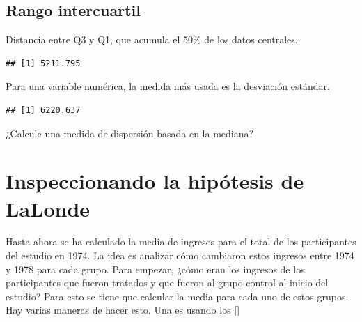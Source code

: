 \documentclass[
]{article}
\newenvironment{Shaded}{\begin{snugshade}}{\end{snugshade}}
\newcommand{\DecValTok}[1]{\textcolor[rgb]{0.00,0.00,0.81}{#1}}
\newcommand{\FunctionTok}[1]{\textcolor[rgb]{0.00,0.00,0.00}{#1}}
\newcommand{\NormalTok}[1]{#1}
\newcommand{\SpecialCharTok}[1]{\textcolor[rgb]{0.00,0.00,0.00}{#1}}
\begin{document}
\hypertarget{rango-intercuartil-1}{%
\subsection{Rango intercuartil}\label{rango-intercuartil-1}}

Distancia entre Q3 y Q1, que acumula el 50\% de los datos centrales.

\begin{Shaded}
\end{Shaded}

\begin{verbatim}
## [1] 5211.795
\end{verbatim}

Para una variable numérica, la medida más usada es la desviación
estándar.

\begin{Shaded}
\end{Shaded}

\begin{verbatim}
## [1] 6220.637
\end{verbatim}

¿Calcule una medida de dispersión basada en la mediana?

\hypertarget{inspeccionando-la-hipuxf3tesis-de-lalonde}{%
\section{Inspeccionando la hipótesis de
LaLonde}\label{inspeccionando-la-hipuxf3tesis-de-lalonde}}

Hasta ahora se ha calculado la media de ingresos para el total de los
participantes del estudio en 1974. La idea es analizar cómo cambiaron
estos ingresos entre 1974 y 1978 para cada grupo. Para empezar, ¿cómo
eran los ingresos de los participantes que fueron tratados y que fueron
al grupo control al inicio del estudio? Para esto se tiene que calcular
la media para cada uno de estos grupos. Hay varias maneras de hacer
esto. Una es usando los {[}{]}

\begin{Shaded}
\end{Shaded}
\end{document}
